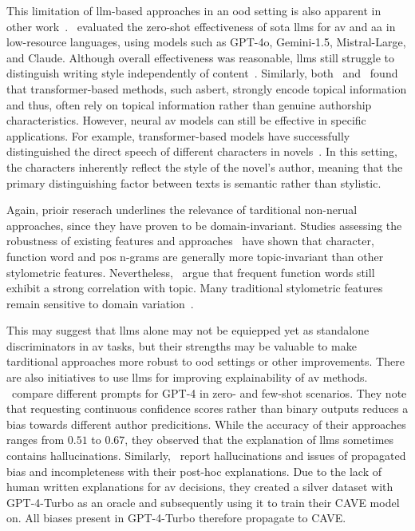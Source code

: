 This limitation of \ac{llm}-based approaches in an \ac{ood} setting is also apparent in other work~\citep{rivera_soto_learning_2021}.
\citet{schmidt_llm_av_latin_24}\ evaluated the zero-shot effectiveness of \acl{sota} \acp{llm} for \ac{av} and \ac{aa} in low-resource languages, using models such as GPT-4o, Gemini-1.5, Mistral-Large, and Claude. 
Although overall effectiveness was reasonable, \acp{llm} still struggle to distinguish writing style independently of content~\citep{schmidt_llm_av_latin_24}. 
Similarly, both \citet{nguyen_bert_topic_av_2023}\ and \citet{sawatphol_cross_topic_av_24}\ found that transformer-based methods, such as\ac{bert}, strongly encode topical information and thus, often rely on topical information rather than genuine authorship characteristics.
However, neural \ac{av} models can still be effective in specific applications. 
For example, transformer-based models have successfully distinguished the direct speech of different characters in novels~\citep{michel_fictional_2024}. 
In this setting, the characters inherently reflect the style of the novel’s author, meaning that the primary distinguishing factor between texts is semantic rather than stylistic.

Again, prioir reserach underlines the relevance of tarditional non-nerual approaches, since they have proven to be domain-invariant.
Studies assessing the robustness of existing features and approaches~\citep{stamatatos_survey_2009,barlas_cross_domain_2020} have shown that character, function word and \ac{pos} n-grams are generally more topic-invariant than other stylometric features.
Nevertheless, \citet{bischoff_importance_2020}\ argue that frequent function words still exhibit a strong correlation with topic.
Many traditional stylometric features remain sensitive to domain variation~\citep{rivera_soto_learning_2021}.

This may suggest that \acp{llm} alone may not be equiepped yet as standalone discriminators in \ac{av} tasks, but their strengths may be valuable to make tarditional approaches more robust to \ac{ood} settings or other improvements.
There are also initiatives to use \acp{llm} for improving explainability of \ac{av} methods.
\citet{hung_xai_av_llm_2023}\ compare different prompts for GPT-4 in zero- and few-shot scenarios.
They note that requesting continuous confidence scores rather than binary outputs reduces a bias towards different author predicitions.
While the accuracy of their approaches ranges from $0.51$ to $0.67$, they observed that the explanation of \acp{llm} sometimes contains hallucinations.
Similarly, \citet{ramnath_cave_xai_llm_2025}\ report hallucinations and issues of propagated bias and incompleteness with their post-hoc explanations.
Due to the lack of human written explanations for \ac{av} decisions, they created a silver dataset with GPT-4-Turbo as an oracle and subsequently using it to train their CAVE model on.
All biases present in GPT-4-Turbo therefore propagate to CAVE.

